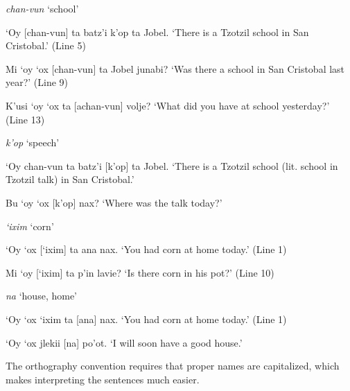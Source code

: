 \documentclass[12pt]{article}
\newcommand*{\form}[1]{\emph{#1}}
\newcommand{\translate}[1]{`#1'}
\def\\{}%
\begin{document}
\begin{exe}
    \ex\label{ex:n-school} \form{chan-vun} \translate{school} 
    \begin{xlist}
        \ex `Oy [chan-vun] ta batz'i k'op ta Jobel. \\
        \translate{There is a Tzotzil school in San Cristobal.} (Line 5)
        
        \ex Mi `oy `ox [chan-vun] ta Jobel junabi? \\
        \translate{Was there a school in San Cristobal last year?} (Line 9)
        
        \ex K'usi `oy `ox ta [achan-vun] volje? \\
        \translate{What did you have at school yesterday?} (Line 13)
    \end{xlist}

    \ex\label{ex:n-speech} \form{k'op} \translate{speech}
    \begin{xlist}
        \ex `Oy chan-vun ta batz'i [k'op] ta Jobel. \\
        \translate{There is a Tzotzil school (lit. school in Tzotzil talk) in San Cristobal.}
        
        \ex Bu `oy `ox [k'op] nax? \\
        \translate{Where was the talk today?}
    \end{xlist}
    
    \ex \form{`ixim} \translate{corn}
    \begin{xlist}
        \ex `Oy `ox [`ixim] ta ana nax. \\
        \translate{You had corn at home today.} (Line 1)
        
        \ex Mi `oy [`ixim] ta p'in lavie? \\
        \translate{Is there corn in his pot?} (Line 10)
    \end{xlist}

    \ex \form{na} \translate{house, home} 
    \begin{xlist}
        \ex `Oy `ox `ixim ta [ana] nax. \\
        \translate{You had corn at home today.} (Line 1)
        
        \ex `Oy `ox jlekii [na] po'ot. \\
        \translate{I will soon have a good house.}
    \end{xlist}
\end{exe}

The orthography convention 
requires that proper names are capitalized,
which makes interpreting the sentences much easier.
\end{document}
